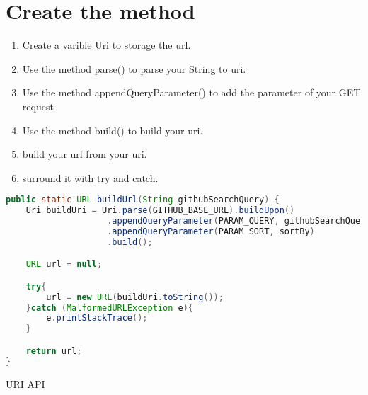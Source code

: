 \documentclass[12pt]{article} %
\begin{document}

\section{Create the method}

\begin{enumerate}
	\item Create a varible Uri to storage the url.
	\item Use the method parse() to parse your String to uri.
	\item Use the method appendQueryParameter() to add the parameter of your GET request
	\item Use the method build() to build your uri.
	\item build your url from your uri.
	\item surround it with try and catch.
\end{enumerate}

\begin{lstlisting}[language=Java]
public static URL buildUrl(String githubSearchQuery) {
	Uri buildUri = Uri.parse(GITHUB_BASE_URL).buildUpon()
					.appendQueryParameter(PARAM_QUERY, githubSearchQuery)
					.appendQueryParameter(PARAM_SORT, sortBy)
					.build();

	URL url = null;

	try{
		url = new URL(buildUri.toString());
	}catch (MalformedURLException e){
		e.printStackTrace();
	}

	return url;
}
\end{lstlisting}

\href{https://developer.android.com/reference/android/net/Uri.html}{URI API}
\end{document}
